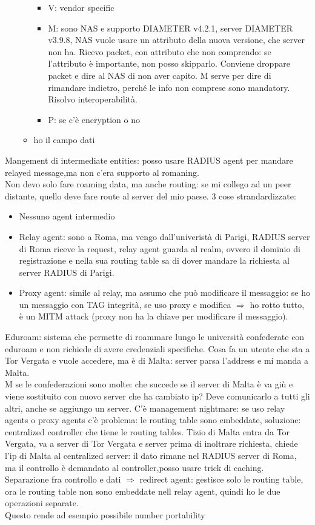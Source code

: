\documentclass[16px]{article}
\begin{document}
\begin{itemize}
\begin{itemize}
\begin{itemize}
\item V: vendor specific
\item M: sono NAS e supporto DIAMETER v4.2.1, server DIAMETER v3.9.8, NAS vuole usare un attributo della nuova versione, che server non ha. Ricevo packet, con attributo che non comprendo: se l'attributo è importante, non posso skipparlo. Conviene droppare packet e dire al NAS di non aver capito. M serve per dire di rimandare indietro, perché le info non comprese sono mandatory.
Risolvo interoperabilità.
\item P: se c'è encryption o no 
\end{itemize}
\item ho il campo dati
\end{itemize}
\end{itemize}
Mangement di intermediate entities: posso usare RADIUS agent per mandare relayed message,ma non c'era supporto al romaning.\\ Non devo solo fare roaming data, ma anche routing: se mi collego ad un peer distante, quello deve fare route al server del mio paese. 3 cose strandardizzate:
\begin{itemize}
\item Nessuno agent intermedio
\item Relay agent: sono a Roma, ma vengo dall'univeristà di Parigi, RADIUS server di Roma riceve la request, relay agent guarda al realm, ovvero il dominio di registrazione e nella sua routing table sa di dover mandare la richiesta al server RADIUS di Parigi.
\item Proxy agent: simile al relay, ma assumo che può modificare il messaggio: se ho un messaggio con TAG integrità, se uso proxy e modifica $\Rightarrow$ ho rotto tutto, è un MITM attack (proxy non ha la chiave per modificare il messaggio).
\end{itemize}
Eduroam: sistema che permette di roammare lungo le università confederate con eduroam e non richiede di avere credenziali specifiche. Cosa fa un utente che sta a Tor Vergata e vuole accedere, ma è di Malta: server parsa l'address e mi manda a Malta.\\ M se le confederazioni sono molte: che succede se il server di Malta è va giù e viene sostituito con nuovo server che ha cambiato ip? Deve comunicarlo a tutti gli altri, anche se aggiungo un server. C'è management nightmare: se uso relay agents o proxy agents c'è problema: le routing table sono embeddate, soluzione: centralized controller che tiene le routing tables. Tizio di Malta entra da Tor Vergata, va a server di Tor Vergata e server prima di inoltrare richiesta, chiede l'ip di Malta al centralized server: il dato rimane nel RADIUS server di Roma, ma il controllo è demandato al controller,posso usare trick di caching. Separazione fra controllo e dati $\Rightarrow$ redirect agent: gestisce solo le routing table, ora le routing table non sono embeddate nell relay agent, quindi ho le due operazioni separate.\\ Questo rende ad esempio possibile number portability
\end{document}
